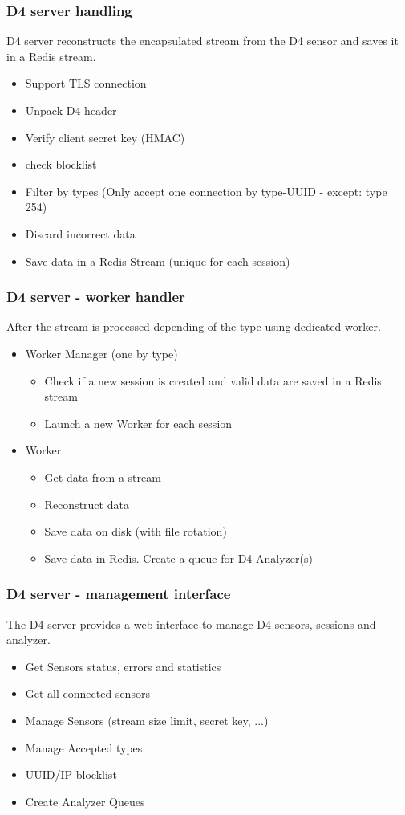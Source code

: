 \documentclass{beamer}
\begin{document}
\begin{frame}
\frametitle{D4 server handling}

D4 server reconstructs the encapsulated stream from the D4 sensor and saves it in a Redis stream.

\begin{itemize}
\item Support TLS connection
\item Unpack D4 header
\item Verify client secret key (HMAC)
\item check blocklist
\item Filter by types (Only accept one connection by type-UUID - except: type 254)
\item Discard incorrect data
\item Save data in a Redis Stream (unique for each session)
\end{itemize}
\end{frame}

\begin{frame}
        \frametitle{D4 server - worker handler}
After the stream is processed depending of the type using dedicated worker.
        \begin{itemize}
        \item Worker Manager (one by type)
                \begin{itemize}
                \item Check if a new session is created and valid data are saved in a Redis stream
                \item Launch a new Worker for each session
                \end{itemize}
        \item Worker
                \begin{itemize}
                 \item Get data from a stream
    		     \item Reconstruct data
                 \item Save data on disk (with file rotation)
                 \item Save data in Redis. Create a queue for D4 Analyzer(s)
                \end{itemize}
        \end{itemize}
\end{frame}

\begin{frame}
        \frametitle{D4 server - management interface}
The D4 server provides a web interface to manage D4 sensors, sessions and analyzer.
        \begin{itemize}
\item Get Sensors status, errors and statistics
\item Get all connected sensors
\item Manage Sensors (stream size limit, secret key, ...)
\item Manage Accepted types
\item UUID/IP blocklist
\item  Create Analyzer Queues
        \end{itemize}
\end{frame}
\end{document}
